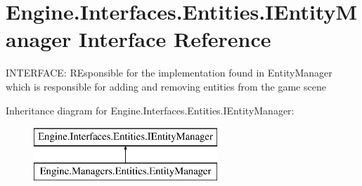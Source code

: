 \hypertarget{a00442}{}\section{Engine.\+Interfaces.\+Entities.\+I\+Entity\+Manager Interface Reference}
\label{a00442}


I\+N\+T\+E\+R\+F\+A\+CE\+: R\+Esponsible for the implementation found in Entity\+Manager which is responsible for adding and removing entities from the game scene  


Inheritance diagram for Engine.\+Interfaces.\+Entities.\+I\+Entity\+Manager\+:\begin{figure}[H]
\begin{center}
\leavevmode
\includegraphics[height=2.000000cm]{db/d34/a00442}
\end{center}
\end{figure}
